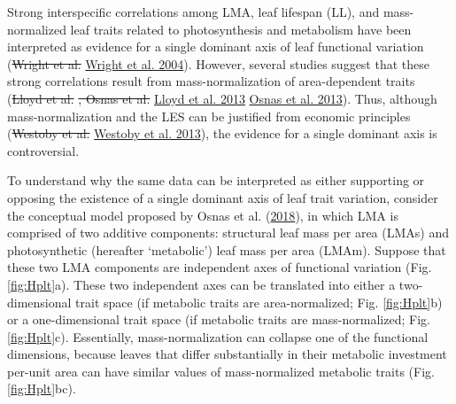 \documentclass[
  12pt,
]{article}
\providecommand{\DIFaddtex}[1]{{\protect\color{blue}\uwave{#1}}} %
\providecommand{\DIFdeltex}[1]{{\protect\color{red}\sout{#1}}}                      %
\providecommand{\DIFaddbegin}{} %
\providecommand{\DIFaddend}{} %
\providecommand{\DIFdelbegin}{} %
\providecommand{\DIFdelend}{} %
\providecommand{\DIFadd}[1]{\texorpdfstring{\DIFaddtex{#1}}{#1}} %
\providecommand{\DIFdel}[1]{\texorpdfstring{\DIFdeltex{#1}}{}} %
\newcommand{\DIFscaledelfig}{0.5}
\newlength{\DIFdelgraphicswidth} %
\newlength{\DIFdelgraphicsheight} %
\newcommand{\DIFaddincludegraphics}[2][]{{\color{blue}\fbox{\DIFOincludegraphics[#1]{#2}}}} %
\newcommand{\DIFdelincludegraphics}[2][]{%
\sbox{\DIFdelgraphicsbox}{\DIFOincludegraphics[#1]{#2}}%
\settoboxwidth{\DIFdelgraphicswidth}{\DIFdelgraphicsbox} %
\settoboxtotalheight{\DIFdelgraphicsheight}{\DIFdelgraphicsbox} %
\scalebox{\DIFscaledelfig}{%
\parbox[b]{\DIFdelgraphicswidth}{\usebox{\DIFdelgraphicsbox}\\[-\baselineskip] \rule{\DIFdelgraphicswidth}{0em}}\llap{\resizebox{\DIFdelgraphicswidth}{\DIFdelgraphicsheight}{%
\setlength{\unitlength}{\DIFdelgraphicswidth}%
\begin{picture}(1,1)%
\thicklines\linethickness{2pt} %
{\color[rgb]{1,0,0}\put(0,0){\framebox(1,1){}}}%
{\color[rgb]{1,0,0}\put(0,0){\line( 1,1){1}}}%
{\color[rgb]{1,0,0}\put(0,1){\line(1,-1){1}}}%
\end{picture}%
}\hspace*{3pt}}} %
} %
\DeclareRobustCommand{\DIFaddbegin}{\DIFOaddbegin \let\includegraphics\DIFaddincludegraphics} %
\DeclareRobustCommand{\DIFaddend}{\DIFOaddend \let\includegraphics\DIFOincludegraphics} %
\DeclareRobustCommand{\DIFdelbegin}{\DIFOdelbegin \let\includegraphics\DIFdelincludegraphics} %
\DeclareRobustCommand{\DIFdelend}{\DIFOaddend \let\includegraphics\DIFOincludegraphics} %
\begin{document}
Strong interspecific correlations among LMA, leaf lifespan (LL), and mass-normalized leaf traits related to photosynthesis and metabolism have been interpreted as evidence for a single dominant axis of leaf functional variation (\DIFdelbegin \DIFdel{Wright et al. }\DIFdelend \protect\DIFdelbegin %
\DIFdelend \DIFaddbegin \hyperlink{ref-Wright2004a}{Wright et al. 2004}\DIFaddend ).
However, several studies suggest that these strong correlations result from mass-normalization of area-dependent traits (\DIFdelbegin \DIFdel{Lloyd et al. }\DIFdelend \protect\DIFdelbegin %
\DIFdel{, Osnas et al. }\DIFdelend \DIFaddbegin \hyperlink{ref-Lloyd2013}{Lloyd et al. 2013}\DIFadd{, }\DIFaddend \protect\DIFdelbegin %
\DIFdelend \DIFaddbegin \hyperlink{ref-Osnas2013}{Osnas et al. 2013}\DIFaddend ).
Thus, although mass-normalization and the LES can be justified from economic principles (\DIFdelbegin \DIFdel{Westoby et al. }\DIFdelend \protect\DIFdelbegin %
\DIFdelend \DIFaddbegin \hyperlink{ref-Westoby2013}{Westoby et al. 2013}\DIFaddend ), the evidence for a single dominant axis is controversial.

To understand why the same data can be interpreted as either supporting or opposing the existence of a single dominant axis of leaf trait variation, consider the conceptual model proposed by Osnas et al. (\protect\hyperlink{ref-Osnas2018}{2018}), in which LMA is comprised of two additive components: structural leaf mass per area (LMAs) and photosynthetic (hereafter `metabolic') leaf mass per area (LMAm).
Suppose that these two LMA components are independent axes of functional variation (Fig. \ref{fig:Hplt}a).
These two independent axes can be translated into either a two-dimensional trait space (if metabolic traits are area-normalized; Fig. \ref{fig:Hplt}b) or a one-dimensional trait space (if metabolic traits are mass-normalized; Fig. \ref{fig:Hplt}c).
Essentially, mass-normalization can collapse one of the functional dimensions, because leaves that differ substantially in their metabolic investment per-unit area can have similar values of mass-normalized metabolic traits (Fig. \ref{fig:Hplt}bc).
\end{document}
